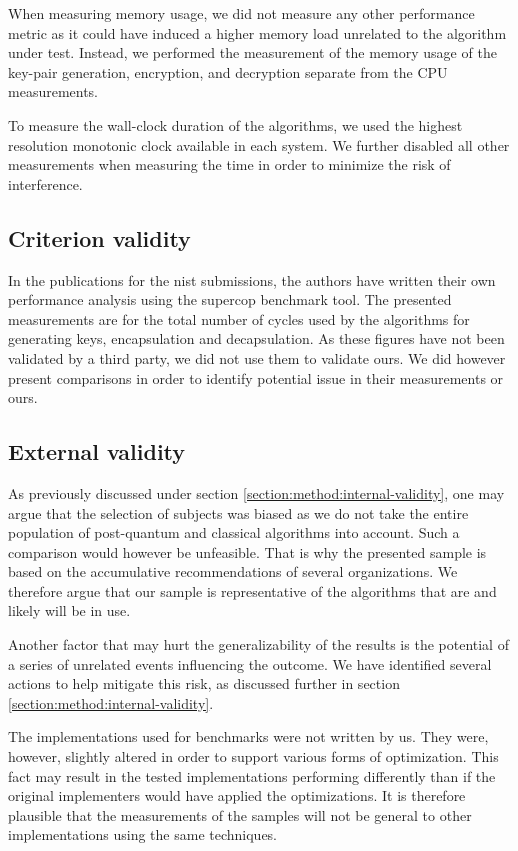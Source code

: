 When measuring memory usage, we did not measure any other performance metric as it could have induced a higher memory load unrelated to the algorithm under test. Instead, we performed the measurement of the memory usage of the key-pair generation, encryption, and decryption separate from the CPU measurements.

To measure the wall-clock duration of the algorithms, we used the highest resolution monotonic clock available in each system. We further disabled all other measurements when measuring the time in order to minimize the risk of interference.

\subsection{Criterion validity}

In the publications for the \gls{nist} submissions, the authors have written their own performance analysis using the \gls{supercop} benchmark tool. The presented measurements are for the total number of cycles used by the algorithms for generating keys, encapsulation and decapsulation. As these figures have not been validated by a third party, we did not use them to validate ours. We did however present comparisons in order to identify potential issue in their measurements or ours.

\subsection{External validity}

As previously discussed under section \ref{section:method:internal-validity}, one may argue that the selection of subjects was biased as we do not take the entire population of post-quantum and classical algorithms into account. Such a comparison would however be unfeasible. That is why the presented sample is based on the accumulative recommendations of several organizations. We therefore argue that our sample is representative of the algorithms that are and likely will be in use.

Another factor that may hurt the generalizability of the results is the potential of a series of unrelated events influencing the outcome. We have identified several actions to help mitigate this risk, as discussed further in section \ref{section:method:internal-validity}.

The implementations used for benchmarks were not written by us. They were, however, slightly altered in order to support various forms of optimization. This fact may result in the tested implementations performing differently than if the original implementers would have applied the optimizations. It is therefore plausible that the measurements of the samples will not be general to other implementations using the same techniques.

